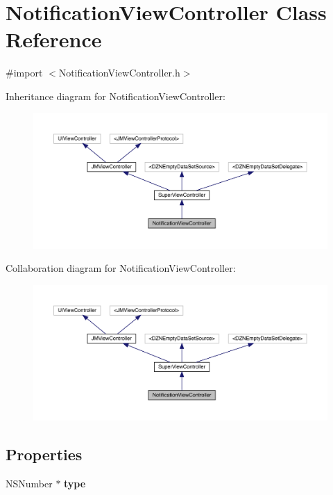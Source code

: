 \hypertarget{interface_notification_view_controller}{}\section{Notification\+View\+Controller Class Reference}
\label{interface_notification_view_controller}


{\ttfamily \#import $<$Notification\+View\+Controller.\+h$>$}



Inheritance diagram for Notification\+View\+Controller\+:\nopagebreak
\begin{figure}[H]
\begin{center}
\leavevmode
\includegraphics[width=350pt]{interface_notification_view_controller__inherit__graph}
\end{center}
\end{figure}


Collaboration diagram for Notification\+View\+Controller\+:\nopagebreak
\begin{figure}[H]
\begin{center}
\leavevmode
\includegraphics[width=350pt]{interface_notification_view_controller__coll__graph}
\end{center}
\end{figure}
\subsection*{Properties}
\begin{DoxyCompactItemize}
\item 
\mbox{\label{interface_notification_view_controller_a61cc9e436399ee9151297bf67fcec51d}} 
N\+S\+Number $\ast$ {\bfseries type}
\end{DoxyCompactItemize}

